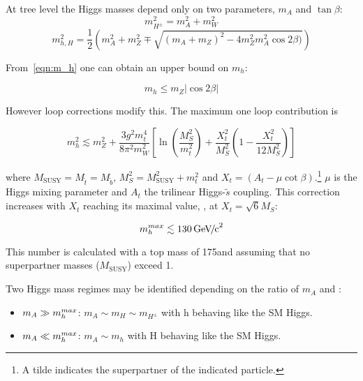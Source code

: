 At tree level the Higgs masses depend only on two parameters, $m_{A}$ and $\tan{\beta}$:
\begin{equation}
	m_{H^{\pm}}^2 = m_{A}^2 + m_{W}^2
\end{equation}
\begin{equation}
	m_{h,H}^2 = \frac{1}{2}\left( m_{A}^2 + m_{Z}^2 \mp 
	\sqrt{(m_{A} + m_{Z})^2 - 4m_{Z}^2 m_{A}^2 \cos{2\beta})}
	\right)
	\label{eqn:m_h}
\end{equation}

From~\ref{eqn:m_h} one can obtain an upper bound on $m_{h}$:

\begin{equation}
	m_{h} \le m_{Z}|\cos{2\beta}|
\end{equation}

However loop corrections modify this. The maximum one loop contribution is

\begin{equation}
	m_{h}^2 \lesssim m_{Z}^2 + \frac{3g^2m_{t}^4}{8\pi^2m_{W}^2} 
	\left[ 
	  \ln \left( \frac{M_{S}^2}{m_{t}^2} \right) + \frac{X_{t}^2}{M_{S}^2} 
	    \left( 1 - \frac{X_{t}^2}{12 M_{S}^2} \right)
	\right] 
\end{equation}

where $M_{\mathrm{SUSY}} = M_{\tilde{t}} = M_{\tilde{b}}$, $M_{S}^2 = M_{\mathrm{SUSY}}^2 + m_{t}^2$ and $X_{t} = (A_{t} - \mu \cot{\beta})$.\footnote{A tilde indicates the superpartner of the indicated particle.} $\mu$ is the Higgs mixing parameter and $A_t$ the trilinear Higgs-$\tilde{s}$ coupling. This correction increases with $X_t$ reaching its maximal value, \mhmax, at $X_t = \sqrt{6}M_S$:

\begin{equation}
	m_{h}^{max} \lesssim 130 {\,\mathrm{Ge\hspace{-.08em}V\hspace{-0.16em}/\hspace{-0.08em}c}^\mathrm{2}}
\end{equation}

This number is calculated with a top mass of 175\GeVcc and assuming that no superpartner masses ($M_{\mathrm{SUSY}}$) exceed 1\TeVcc. 

Two Higgs mass regimes may be identified depending on the ratio of $m_{A}$ and \mhmax:

\begin{itemize}
	\item $m_{A} \gg m_{h}^{max}$: $m_A \sim m_H \sim m_{H^{\pm}}$ with h behaving like the SM Higgs.
	\item $m_{A} \ll m_{h}^{max}$: $m_A \sim m_h$ with H behaving like the SM Higgs.
\end{itemize}

